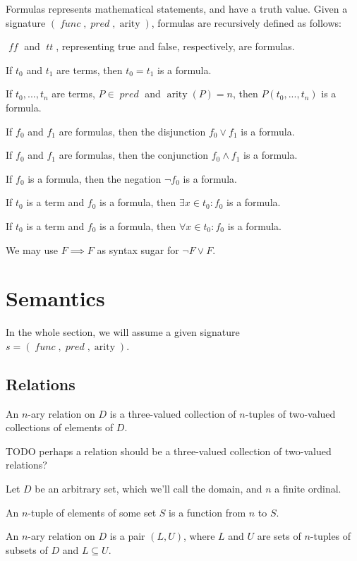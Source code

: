 \documentclass[oneside,12pt]{book}
\theoremstyle{definition}
\theoremstyle{remark}
\newcommand\var[1]{\mathop{\mathit{#1}}\nolimits}
\DeclareMathOperator{\arity}{arity}
\newcommand{\false}{\var{tt}}
\newcommand{\true}{\var{ff}}
\newcommand{\func}{\var{func}}
\newcommand{\pred}{\var{pred}} %
\begin{document}
\noindent Formulas represents mathematical statements, and have a truth value.
Given a signature $(\func, \pred, \arity)$, formulas are recursively defined as follows:
\begin{compactenum}
  \item $\true$ and $\false$, representing true and false, respectively, are formulas.
  \item If $t_0$ and $t_1$ are terms, then $t_0 = t_1$ is a formula.
  \item If $t_0, ..., t_n$ are terms, $P \in \pred$ and $\arity(P) = n$,
    then $P(t_0, ..., t_n)$ is a formula.
  \item If $f_0$ and $f_1$ are formulas, then the disjunction $f_0 \lor f_1$ is a formula.
  \item If $f_0$ and $f_1$ are formulas, then the conjunction $f_0 \land f_1$ is a formula.
  \item If $f_0$ is a formula, then the negation $\neg f_0$ is a formula.
  \item If $t_0$ is a term and $f_0$ is a formula, then $\exists x \in t_0\colon f_0$
    is a formula.
  \item If $t_0$ is a term and $f_0$ is a formula, then $\forall x \in t_0\colon f_0$
    is a formula.
\end{compactenum}

\noindent We may use $F \implies F$ as syntax sugar for $\neg F \lor F$.

\section{Semantics}
In the whole section, we will assume a given signature $s = (\func, \pred, \arity)$.

\subsection{Relations}

An $n$-ary relation on $D$ is a three-valued collection of $n$-tuples
of two-valued collections of elements of $D$.

TODO perhaps a relation should be a three-valued collection of two-valued relations?


\begin{defBox}
  Let $D$ be an arbitrary set, which we'll call the domain, and $n$ a finite ordinal.
  
  \medskip \noindent An $n$-tuple of elements of some set $S$ is a function from $n$ to $S$.
  
  \medskip \noindent An $n$-ary relation on $D$ is a pair $(L, U)$,
  where $L$ and $U$ are sets of $n$-tuples of subsets of $D$ and $L \subseteq U$.
\end{defBox}
\end{document}
